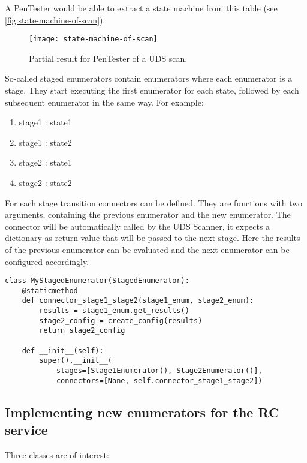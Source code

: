 A PenTester would be able to extract a state machine from this table (see \autoref{fig:state-machine-of-scan}).

\begin{figure}[h]
    \centering
    \texttt{[image: state-machine-of-scan]}
    \caption{Partial result for PenTester of a UDS scan.}
    \label{fig:state-machine-of-scan}
\end{figure}

So-called staged enumerators contain enumerators where each enumerator is a stage. They start executing the first enumerator for each state, followed by each subsequent enumerator in the same way. For example:
\begin{enumerate}
    \item stage1 : state1
    \item stage1 : state2
    \item stage2 : state1
    \item stage2 : state2
\end{enumerate}

For each stage transition connectors can be defined. They are functions with two arguments, containing the previous enumerator and the new enumerator. The connector will be automatically called by the UDS Scanner, it expects a dictionary as return value that will be passed to the next stage. Here the results of the previous enumerator can be evaluated and the next enumerator can be configured accordingly.

\begin{samepage}
\begin{verbatim}
class MyStagedEnumerator(StagedEnumerator):
    @staticmethod
    def connector_stage1_stage2(stage1_enum, stage2_enum):
        results = stage1_enum.get_results()
        stage2_config = create_config(results)
        return stage2_config
    
    def __init__(self):
        super().__init__(
            stages=[Stage1Enumerator(), Stage2Enumerator()],
            connectors=[None, self.connector_stage1_stage2])
\end{verbatim}
\end{samepage}

\subsection{Implementing new enumerators for the RC service}

Three classes are of interest:

